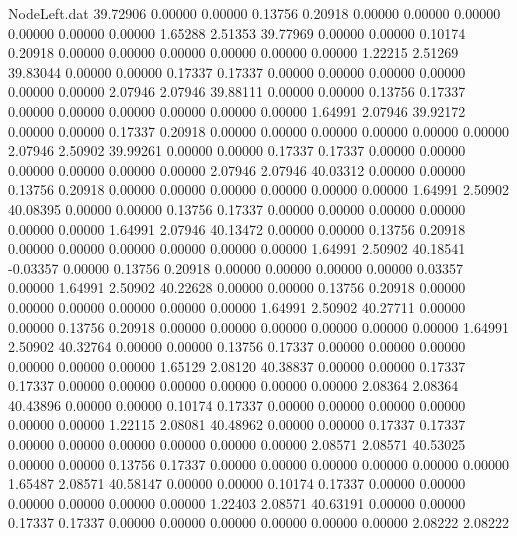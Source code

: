 \begin{filecontents}{NodeLeft.dat}
  39.72906    0.00000    0.00000     0.13756    0.20918    0.00000    0.00000    0.00000    0.00000    0.00000    0.00000    1.65288    2.51353
  39.77969    0.00000    0.00000     0.10174    0.20918    0.00000    0.00000    0.00000    0.00000    0.00000    0.00000    1.22215    2.51269
  39.83044    0.00000    0.00000     0.17337    0.17337    0.00000    0.00000    0.00000    0.00000    0.00000    0.00000    2.07946    2.07946
  39.88111    0.00000    0.00000     0.13756    0.17337    0.00000    0.00000    0.00000    0.00000    0.00000    0.00000    1.64991    2.07946
  39.92172    0.00000    0.00000     0.17337    0.20918    0.00000    0.00000    0.00000    0.00000    0.00000    0.00000    2.07946    2.50902
  39.99261    0.00000    0.00000     0.17337    0.17337    0.00000    0.00000    0.00000    0.00000    0.00000    0.00000    2.07946    2.07946
  40.03312    0.00000    0.00000     0.13756    0.20918    0.00000    0.00000    0.00000    0.00000    0.00000    0.00000    1.64991    2.50902
  40.08395    0.00000    0.00000     0.13756    0.17337    0.00000    0.00000    0.00000    0.00000    0.00000    0.00000    1.64991    2.07946
  40.13472    0.00000    0.00000     0.13756    0.20918    0.00000    0.00000    0.00000    0.00000    0.00000    0.00000    1.64991    2.50902
  40.18541   -0.03357    0.00000     0.13756    0.20918    0.00000    0.00000    0.00000    0.00000    0.03357    0.00000    1.64991    2.50902
  40.22628    0.00000    0.00000     0.13756    0.20918    0.00000    0.00000    0.00000    0.00000    0.00000    0.00000    1.64991    2.50902
  40.27711    0.00000    0.00000     0.13756    0.20918    0.00000    0.00000    0.00000    0.00000    0.00000    0.00000    1.64991    2.50902
  40.32764    0.00000    0.00000     0.13756    0.17337    0.00000    0.00000    0.00000    0.00000    0.00000    0.00000    1.65129    2.08120
  40.38837    0.00000    0.00000     0.17337    0.17337    0.00000    0.00000    0.00000    0.00000    0.00000    0.00000    2.08364    2.08364
  40.43896    0.00000    0.00000     0.10174    0.17337    0.00000    0.00000    0.00000    0.00000    0.00000    0.00000    1.22115    2.08081
  40.48962    0.00000    0.00000     0.17337    0.17337    0.00000    0.00000    0.00000    0.00000    0.00000    0.00000    2.08571    2.08571
  40.53025    0.00000    0.00000     0.13756    0.17337    0.00000    0.00000    0.00000    0.00000    0.00000    0.00000    1.65487    2.08571
  40.58147    0.00000    0.00000     0.10174    0.17337    0.00000    0.00000    0.00000    0.00000    0.00000    0.00000    1.22403    2.08571
  40.63191    0.00000    0.00000     0.17337    0.17337    0.00000    0.00000    0.00000    0.00000    0.00000    0.00000    2.08222    2.08222

\end{filecontents}
